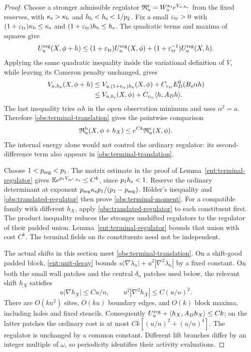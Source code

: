 \begin{proof}
Choose a stronger admissible regulator
\(\mathfrak R_u^{\rm s}=W_u^{\kappa_{\rm s}}e^{V_{u,h_{\rm s}}}\)
from the fixed reserves, with
\(\kappa_{\rm s}>\kappa_{\rm b}\) and
\(h_{\rm b}<h_{\rm s}<1/p_2\).  Fix a small \(\varepsilon_{\rm tr}>0\) with
\((1+\varepsilon_{\rm tr})\kappa_{\rm b}\le\kappa_{\rm s}\) and
\((1+\varepsilon_{\rm tr})h_{\rm b}\le h_{\rm s}\).  The quadratic terms and maxima of squares give
\[
 U_u^{\rm reg}(X,\phi+h)
 \le (1+\varepsilon_{\rm tr})U_u^{\rm reg}(X,\phi)
          +(1+\varepsilon_{\rm tr}^{-1})U_u^{\rm reg}(X,h).
\]
Applying the same quadratic inequality inside the variational
definition of \(V\), while leaving its Cameron penalty unchanged,
gives
\[
\begin{split}
 V_{u,h_{\rm b}}(X,\phi+h)
 &\le V_{u,(1+\varepsilon_{\rm tr})h_{\rm b}}(X,\phi)
                         +C_{\varepsilon_{\rm tr}} E_D^0(B_s\alpha h)\\
 &\le V_{u,h_{\rm s}}(X,\phi)+C_{\varepsilon_{\rm tr}}\langle h,A_Dh\rangle.
\end{split}
\]
The last inequality tries \(\alpha h\) in the open observation
minimum and uses \(\alpha^2=a\).  Therefore
\eqref{obs:terminal-translation} gives the pointwise comparison
\begin{equation}\label{obs:translated-regulator}
 \mathfrak R_u^{\rm b}(X,\phi+h_X)
                  \le e^{Ck}\mathfrak R_u^{\rm s}(X,\phi).
\end{equation}
The internal energy alone would not control the ordinary regulator:
its second-difference term also appears in
\eqref{obs:terminal-translation}.

Choose \(1<p_{\rm seg}<p_1\).  The matrix estimate in the proof of
Lemma~\ref{ent:terminal-regulator} gives
\(\mathbb E e^{p_1V_{m',h_{\rm s}}}\le C^k\), since
\(p_1h_{\rm s}<1\).  Reserve the ordinary determinant at exponent
\(p_{\rm seg}\kappa_{\rm s}p_1/(p_1-p_{\rm seg})\).
H\"older's inequality and \eqref{obs:translated-regulator} then
prove \eqref{obs:terminal-moment}.  For a compatible family with
different \(h_X\), apply \eqref{obs:translated-regulator} to each
constituent first.  The product inequality reduces the stronger
unshifted regulators to the regulator of their padded union.
Lemma~\ref{ent:terminal-regulator} bounds that union with cost
\(C^k\).  The terminal fields on its constituents need not be
independent.

The actual shifts in this section meet
\eqref{obs:terminal-translation}.  On a shift-good padded block,
\eqref{ent:unit-decay} bounds
\(u|\nabla\lambda_n|+u^2|\nabla^2\lambda_n|\) by a fixed constant.
On both the small wall patches and the central \(\delta_n\) patches
used below, the relevant shift \(h_X\) satisfies
\[
 u|\nabla h_X|\le C u/n,\qquad
 u^2|\nabla^2h_X|\le C(u/n)^2.
\]
There are \(O(ku^2)\) sites, \(O(ku)\) boundary
edges, and \(O(k)\) block maxima, including holes and fixed stencils.
Consequently \(U_u^{\rm reg}+\langle h_X,A_Dh_X\rangle\le Ck\); on the
latter patches the ordinary cost is at most
\(Ck[(u/n)^2+(u/n)^4]\).  The regulator is unchanged by a common
constant.  Different lift branches differ by an integer multiple of
\(\omega\), so periodicity identifies their activity evaluations.


\end{proof}
